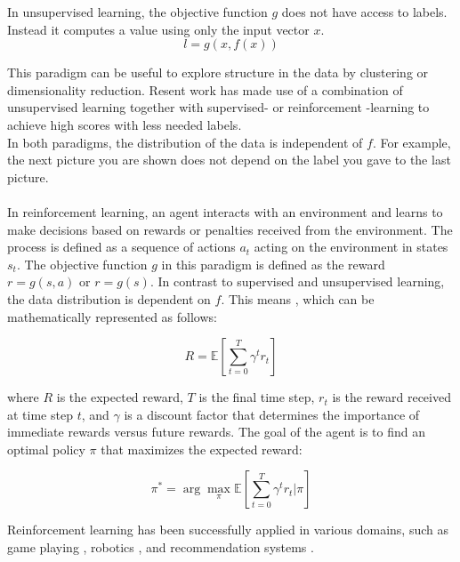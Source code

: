 In unsupervised learning, the objective function $g$ does not have access to labels. Instead it computes a value using only the input vector $x$.
\begin{equation}
    \label{unsupervised_learning_paradigm}
    l = g(x, f(x))
\end{equation}

This paradigm can be useful to explore structure in the data by clustering or dimensionality reduction. Resent work has made use of a combination of unsupervised 
learning together with supervised- or reinforcement -learning to achieve high scores with less needed labels.\\

In both paradigms, the distribution of the data is independent of $f$. For example, the next picture you are shown does not depend on the label 
you gave to the last picture. \\ \\  

In reinforcement learning, an agent interacts with an environment and learns to make decisions based on rewards or penalties 
received from the environment. The process is defined as a sequence of actions $a_t$ acting on the environment in states $s_t$. The objective function 
$g$ in this paradigm is defined as the reward $r = g(s, a)$ or $r=g(s)$. In contrast to supervised and unsupervised learning, the data distribution 
is dependent on $f$. This means , which can be mathematically represented as follows:

\begin{equation}
\label{reinforcement_paradigm}
R = \mathbb{E}\left[\sum_{t=0}^{T} \gamma^t r_t\right]
\end{equation}

where $R$ is the expected reward, $T$ is the final time step, $r_t$ is the reward received at time step $t$, and $\gamma$ is a discount factor 
that determines the importance of immediate rewards versus future rewards. The goal of the agent is to find an optimal policy $\pi$ that maximizes 
the expected reward:

\begin{equation}
\label{policy}
\pi^* = \arg\max_{\pi} \mathbb{E}\left[\sum_{t=0}^{T} \gamma^t r_t | \pi\right]
\end{equation}

Reinforcement learning has been successfully applied in various domains, such as game playing \cite{mnih2015human}, 
robotics \cite{kober2013reinforcement}, and recommendation systems \cite{zhao2018deep}.

